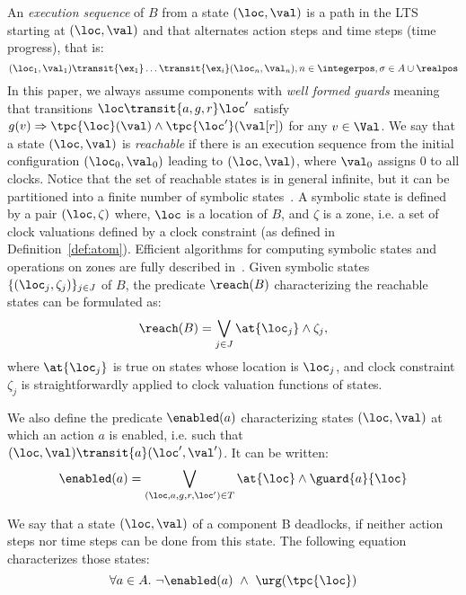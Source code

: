 An \emph{execution sequence} of $B$ from a state $(\loc,\val)$ is a path in the LTS starting at $(\loc,\val)$ and that 
alternates action steps and time steps (time progress), that is:
\begin{displaymath}
  (\loc_1,\val_1) \transit{\ex_1} \ldots \transit{\ex_i} (\loc_n,\val_n),n\in\integerpos,\sigma\in A\cup\realpos
\end{displaymath}
In this paper, we always assume components with \emph{well formed guards} meaning that transitions $\loc \transit{a,g,r} \loc'$ satisfy
$g(v)\Rightarrow\tpc{\loc}(\val)\wedge\tpc{\loc'}(\val[r])$ for any $v \in \Val$.
We say that a state $(\loc,\val)$ is \emph{reachable} if there is an execution sequence from the initial configuration $(\loc_0, \val_0)$ leading to 
$(\loc,\val)$, where $\val_0$ assigns $0$ to all clocks.
Notice that the set of reachable states is in general infinite, but it can be partitioned into a finite number of symbolic
states~\cite{tripakis98:thesis,bengtssonY03,henzinger94}.
A symbolic state is defined by a pair $(\loc,\zeta)$ where, 
$\loc$ is a location of $B$, and $\zeta$ is a zone, i.e. a set of clock valuations defined by a clock constraint (as defined in Definition~\ref{def:atom}).
Efficient algorithms for computing symbolic states and operations on zones are fully described in~\cite{bengtssonY03}.
Given symbolic states $\{ (\loc_j,\zeta_j) \}_{j \in J}$ of $B$, the predicate $\reach(B)$ characterizing the reachable states can be formulated as:
\begin{displaymath}
 \reach(B) = \bigvee_{j \in J} \at{\loc_j} \wedge \zeta_j, 
\end{displaymath}
where $\at{\loc_j}$ is true on states whose location is $\loc_j$, and clock constraint $\zeta_j$ is straightforwardly applied to clock valuation functions of states.

We also define the predicate $\enabled(a)$ characterizing states $(\loc, \val)$ at which an action $a$ is enabled, i.e. such that $(\loc,\val) \transit{a} (\loc',\val')$. It can be written:
\begin{displaymath}
\enabled(a) = \bigvee_{(\loc,a,g,r,\loc') \in T} \at{\loc}  \wedge \guard{a}{\loc}
\end{displaymath}


\begin{definition}[Deadlock]
  We say that a state $(\loc,\val)$ of a component B deadlocks,  
  if neither action steps nor time steps can be done from this state. The following equation characterizes those states:
  \vspace{-1mm}
  \begin{displaymath}
   \forall a\in A. \ \neg\enabled(a) \ \wedge \ \urg(\tpc{\loc})
  \end{displaymath}
\end{definition}


